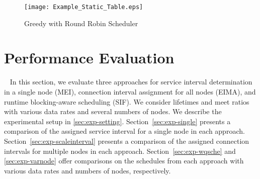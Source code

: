 \documentclass[10pt,journal,compsoc]{IEEEtran}
\begin{document}
\begin{figure*}[!tbhp]
\begin{minipage}[b]{\linewidth}
\centering
\texttt{[image: Example\_Static\_Table.eps]}
\caption{Greedy with Round Robin Scheduler}\label{fig:Ex_Table}
\end{minipage}
\end{figure*}


\section{Performance Evaluation}~\label{sec:Per_eval}
In this section, we evaluate three approaches for service interval determination in a single node (MEI), connection interval assignment for all nodes (EIMA), and runtime blocking-aware scheduling (SIF). We consider lifetimes and meet ratios with various data rates and several numbers of nodes. We describe the experimental setup in \ref{sec:exp-setting}.
Section~\ref{sec:exp-single} presents a comparison of the assigned service interval for a single node in each approach. Section~\ref{sec:exp-scaleinterval} presents a comparison of the assigned connection intervals for multiple nodes in each approach.
Section~\ref{sec:exp-wqsche} and \ref{sec:exp-varnode} offer comparisons on the schedules from each approach with various data rates and numbers of nodes, respectively.
\end{document}
